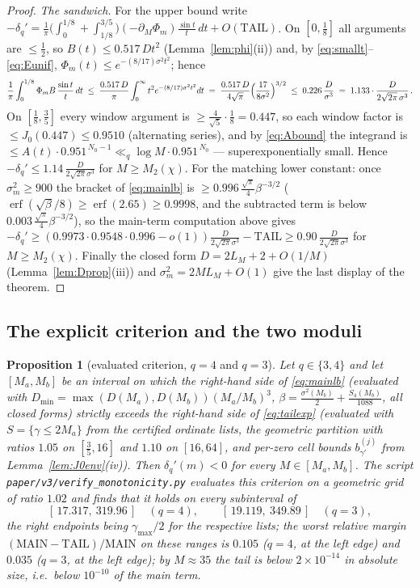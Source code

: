 \documentclass[11pt]{article}
\newtheorem{proposition}{Proposition}
\begin{document}
\begin{proof}
\emph{The sandwich.} For the upper bound write
$-\delta_q'=\frac1\pi\bigl(\int_0^{1/8}+\int_{1/8}^{3/5}\bigr)
(-\partial_M\Phi_m)\frac{\sin t}t\,dt+O(\mathrm{TAIL})$. On
$[0,\tfrac18]$ all arguments are $\le\tfrac12$, so
$B(t)\le0.517\,Dt^2$ (Lemma~\ref{lem:phi}(ii)) and, by
\eqref{eq:smallt}--\eqref{eq:Eunif},
$\Phi_m(t)\le e^{-(8/17)\sigma^2t^2}$; hence
\[
\frac1\pi\int_0^{1/8}\Phi_mB\,\frac{\sin t}t\,dt
\;\le\;\frac{0.517\,D}\pi\int_0^\infty t^2e^{-(8/17)\sigma^2t^2}dt
\;=\;\frac{0.517\,D}{4\sqrt\pi}
\Bigl(\frac{17}{8\sigma^2}\Bigr)^{3/2}
\;\le\;0.226\,\frac D{\sigma^3}\;=\;1.133\cdot
\frac D{2\sqrt{2\pi}\,\sigma^3}\,.
\]
On $[\tfrac18,\tfrac35]$ every window argument is
$\ge\tfrac4{\sqrt5}\cdot\tfrac18=0.447$, so each window factor is
$\le J_0(0.447)\le0.9510$ (alternating series), and by
\eqref{eq:Abound} the integrand is
$\le A(t)\cdot0.951^{\,N_0-1}\ll_q\log M\cdot0.951^{\,N_0}$ ---
superexponentially small. Hence
$-\delta_q'\le1.14\,\frac D{2\sqrt{2\pi}\sigma^3}$ for
$M\ge M_2(\chi)$. For the matching lower constant: once
$\sigma_m^2\ge900$ the bracket of \eqref{eq:mainlb} is
$\ge0.996\,\tfrac{\sqrt\pi}4\beta^{-3/2}$
($\operatorname{erf}(\sqrt\beta/8)\ge\operatorname{erf}(2.65)
\ge0.9998$, and the subtracted term is below
$0.003\,\tfrac{\sqrt\pi}4\beta^{-3/2}$), so the main-term
computation above gives
$-\delta_q'\ge(0.9973\cdot0.9548\cdot0.996-o(1))
\frac D{2\sqrt{2\pi}\sigma^3}-\mathrm{TAIL}
\ge0.90\,\frac D{2\sqrt{2\pi}\sigma^3}$ for $M\ge M_2(\chi)$.
Finally the closed form $D=2L_M+2+O(1/M)$
(Lemma~\ref{lem:Dprop}(iii)) and
$\sigma_m^2=2ML_M+O(1)$ give the last display of the theorem.
\end{proof}

\subsection*{The explicit criterion and the two moduli}

\begin{proposition}[evaluated criterion, $q=4$ and $q=3$]
\label{prop:criterion-eval}
Let $q\in\{3,4\}$ and let $[M_a,M_b]$ be an interval on which the
right-hand side of \eqref{eq:mainlb} (evaluated with
$D_{\min}=\max(D(M_a),D(M_b))(M_a/M_b)^3$,
$\beta=\tfrac{\sigma^2(M_b)}2+\tfrac{S_4(M_b)}{1088}$, all closed
forms) strictly exceeds the right-hand side of \eqref{eq:tailexp}
(evaluated with $S=\{\gamma\le2M_a\}$ from the certified ordinate
lists, the geometric partition with ratios $1.05$ on
$[\tfrac35,16]$ and $1.10$ on $[16,64]$, and per-zero cell bounds
$b^{(j)}_{\gamma'}$ from Lemma~\ref{lem:J0env}(iv)). Then
$\delta_q'(m)<0$ for every $M\in[M_a,M_b]$. The script
\texttt{paper/v3/verify\_monotonicity.py} evaluates this criterion on
a geometric grid of ratio $1.02$ and finds that it holds on every
subinterval of
\[
[\,17.317,\ 319.96\,]\quad(q=4),
\qquad
[\,19.119,\ 349.89\,]\quad(q=3),
\]
the right endpoints being $\gamma_{\max}/2$ for the respective lists;
the worst relative margin
$(\mathrm{MAIN}-\mathrm{TAIL})/\mathrm{MAIN}$ on these ranges is
$0.105$ ($q=4$, at the left edge) and $0.035$ ($q=3$, at the left
edge); by $M\approx35$ the tail is below $2\times10^{-14}$ in
absolute size, i.e.\ below $10^{-10}$ of the main term.
\end{proposition}
\end{document}
